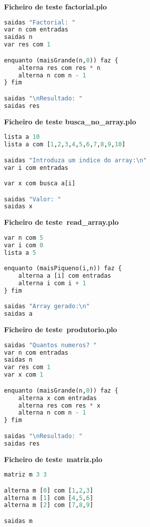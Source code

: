 \documentclass[11pt,a4paper]{report}%
\begin{document}
\textbf{Ficheiro de teste factorial.plo}
\begin{scriptsize}
\begin{lstlisting}[language=python]
saidas "Factorial: "
var n com entradas
saidas n
var res com 1

enquanto (maisGrande(n,0)) faz {
    alterna res com res * n
    alterna n com n - 1
} fim

saidas "\nResultado: "
saidas res
\end{lstlisting}
\end{scriptsize}


\textbf{Ficheiro de teste busca\_no\_array.plo}
\begin{scriptsize}
\begin{lstlisting}[language=python]
lista a 10
lista a com [1,2,3,4,5,6,7,8,9,10]

saidas "Introduza um indice do array:\n"
var i com entradas

var x com busca a[i]

saidas "Valor: "
saidas x
\end{lstlisting}
\end{scriptsize}

\textbf{Ficheiro de teste\ read\_array.plo}
\begin{scriptsize}
\begin{lstlisting}[language=python]
var n com 5
var i com 0
lista a 5

enquanto (maisPiqueno(i,n)) faz {
    alterna a [i] com entradas
    alterna i com i + 1
} fim

saidas "Array gerado:\n"
saidas a
\end{lstlisting}
\end{scriptsize}


\textbf{Ficheiro de teste\ produtorio.plo}
\begin{scriptsize}
\begin{lstlisting}[language=python]
saidas "Quantos numeros? "
var n com entradas
saidas n
var res com 1
var x com 1

enquanto (maisGrande(n,0)) faz {
    alterna x com entradas
    alterna res com res * x
    alterna n com n - 1
} fim

saidas "\nResultado: "
saidas res
\end{lstlisting}
\end{scriptsize}

\textbf{Ficheiro de teste\ matriz.plo}
\begin{scriptsize}
\begin{lstlisting}[language=python]
matriz m 3 3

alterna m [0] com [1,2,3]
alterna m [1] com [4,5,6]
alterna m [2] com [7,8,9]

saidas m
\end{lstlisting}
\end{scriptsize}
\end{document}
